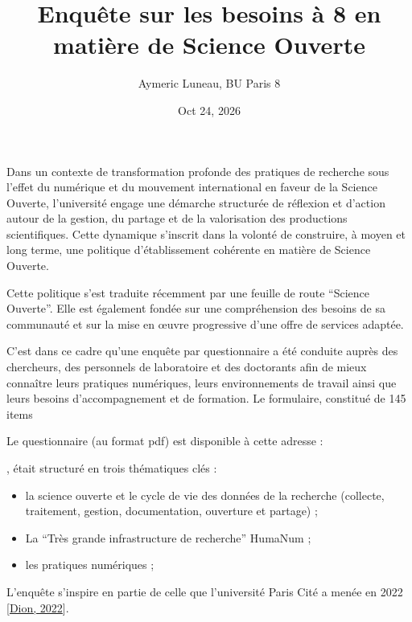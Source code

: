 \documentclass[letterpaper,10pt,english]{jupyterBook}
\title{Enquête sur les besoins à 8 en matière de Science Ouverte}
\date{Oct 24, 2026}
\author{Aymeric Luneau, BU Paris 8}
\begin{document}
\pagestyle{empty}
\sphinxmaketitle
\pagestyle{plain}
\sphinxtableofcontents
\pagestyle{normal}
\label{\detokenize{intro::doc}}


\sphinxAtStartPar
Dans un contexte de transformation profonde des pratiques de recherche sous l’effet du numérique et du mouvement international en faveur de la Science Ouverte, l’université engage une
démarche structurée de réflexion et d’action autour de la gestion, du partage et de la valorisation des productions scientifiques. Cette dynamique s’inscrit dans la volonté de construire, à moyen et long terme, une politique d’établissement cohérente en matière de Science Ouverte.

Cette politique s’est traduite récemment par une feuille de route “Science Ouverte”. Elle est également fondée sur une compréhension des besoins de sa communauté et sur la mise en œuvre
progressive d’une offre de services adaptée.

C’est dans ce cadre qu’une enquête par questionnaire a été conduite auprès des chercheurs, des personnels de laboratoire et des doctorants afin de mieux connaître leurs pratiques numériques, leurs environnements de travail ainsi que leurs besoins d’accompagnement et de formation. Le formulaire, constitué de 145 items%
\begin{footnote}[1]\sphinxAtStartFootnote
Le questionnaire (au format pdf) est disponible à cette adresse : 
%
\end{footnote}, était structuré en trois thématiques clés :
\begin{itemize}
\item {} 
\sphinxAtStartPar
la science ouverte et le cycle de vie des données de la recherche (collecte, traitement, gestion, documentation, ouverture et partage) ;

\item {} 
\sphinxAtStartPar
La “Très grande infrastructure de recherche” Huma\sphinxhyphen{}Num ;

\item {} 
\sphinxAtStartPar
les pratiques numériques ;

\end{itemize}

\sphinxAtStartPar
L’enquête s’inspire en partie de celle que l’université Paris Cité a menée en 2022 {[}\hyperlink{cite.biblio:id46}{Dion, 2022}{]}.
\end{document}

